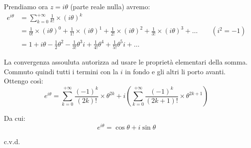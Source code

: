 \documentclass[../dimostrazioni]{subfiles}
\begin{document}
                Prendiamo ora \( z = i\theta \) (parte reale nulla) avremo:
                \begin{align*}
                    e^{i\theta}  &=  \sum_{k=0}^{+\infty} \frac{1}{k!} \times (i\theta)^k \\
                    &= \frac{1}{0!} \times (i\theta)^0 + \frac{1}{1!} \times (i\theta)^1 + \frac{1}{2!} \times (i\theta)^2 +  \frac{1}{3!} \times (i\theta)^3 + \dots  \qquad (i^2 = -1)\\
                    &= 1 + i\theta - \frac{1}{2}\theta^2 - \frac{1}{3!}\theta^3i + \frac{1}{4!}\theta^4 + \frac{1}{5!}\theta^5i + \dots
                \end{align*}
                
                La convergenza assouluta autorizza ad usare le proprietà elementari della somma. 
                Commuto quindi tutti i termini con la \(i\) in fondo e gli altri li porto avanti. Ottengo così:
                \[  e^{i\theta} =\sum_{k=0}^{+\infty} \frac{(-1)^k}{(2k)!} \times \theta^{2k} + i\left(\sum_{k=0}^{+\infty} \frac{(-1)^k}{(2k+1)!} \times \theta^{2k+1}  \right)\]

                Da cui:
                \[ e^{i\theta} = \cos \theta + i \sin \theta \]

                c.v.d.
\end{document}
